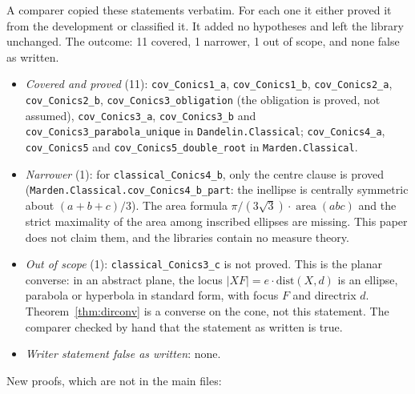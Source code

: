 \documentclass[11pt]{article}
\theoremstyle{remark}
\newcommand{\lean}[1]{\texttt{#1}}
\begin{document}
A comparer copied these statements verbatim. For each one it either proved it from the development
or classified it. It added no hypotheses and left the library unchanged. The outcome: 11 covered,
1 narrower, 1 out of scope, and none false as written.
\begin{itemize}
\item \emph{Covered and proved} (11): \lean{cov\_Conics1\_a}, \lean{cov\_Conics1\_b},
\lean{cov\_Conics2\_a}, \lean{cov\_Conics2\_b}, \lean{cov\_Conics3\_obligation} (the obligation is
proved, not assumed), \lean{cov\_Conics3\_a}, \lean{cov\_Conics3\_b} and
\lean{cov\_Conics3\_parabola\_unique} in \lean{Dandelin.Classical}; \lean{cov\_Conics4\_a},
\lean{cov\_Conics5} and \lean{cov\_Conics5\_double\_root} in \lean{Marden.Classical}.
\item \emph{Narrower} (1): for \lean{classical\_Conics4\_b}, only the centre clause is proved
(\lean{Marden.Classical.cov\_Conics4\_b\_part}: the inellipse is centrally symmetric about
$(a+b+c)/3$). The area formula $\pi/(3\sqrt3)\cdot\operatorname{area}(abc)$ and the strict maximality
of the area among inscribed ellipses are missing. This paper does not claim them, and the libraries
contain no measure theory.
\item \emph{Out of scope} (1): \lean{classical\_Conics3\_c} is not proved. This is the planar
converse: in an abstract plane, the locus $|XF|=e\cdot\mathrm{dist}(X,d)$ is an ellipse, parabola
or hyperbola in standard form, with focus $F$ and directrix $d$. Theorem~\ref{thm:dirconv} is a
converse on the cone, not this statement. The comparer checked by hand that the statement as
written is true.
\item \emph{Writer statement false as written}: none.
\end{itemize}
New proofs, which are not in the main files:
\end{document}
